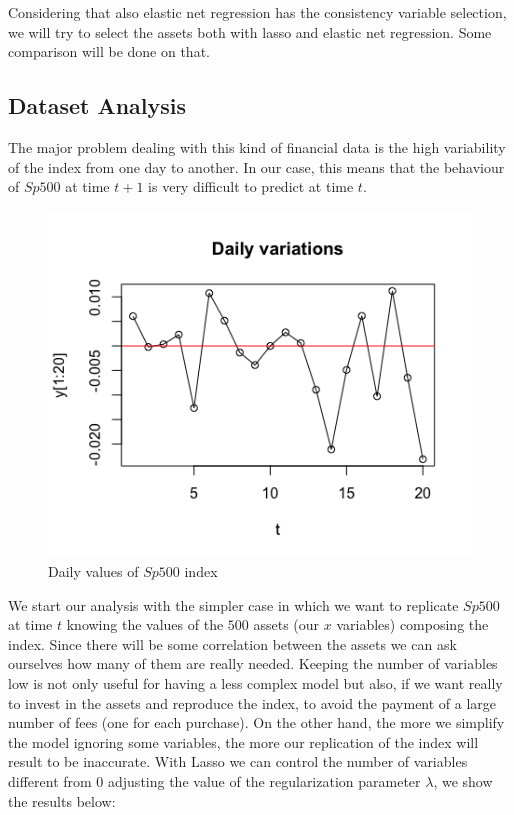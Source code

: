 \documentclass{article}%
\begin{document}
Considering that also elastic net regression has the consistency variable selection, we will try to select the assets both with lasso and elastic net regression. Some comparison will be done on that.

\subsection{Dataset Analysis}
The major problem dealing with this kind of financial data is the high variability of the index from one day to another. In our case, this means that the behaviour of  $Sp500$ at time $t+1$ is very difficult to predict at time $t$.
\begin{figure}[h!]
  \centering
  \includegraphics[scale=0.6]{daily_var.png}
  \caption{Daily values of $Sp500$ index}
  \label{daily_var}
\end{figure}

We start our analysis with the simpler case in which we want to replicate $Sp500$ at time $t$ knowing the values of the $500$ assets (our $x$ variables) composing the index. Since there will be some correlation between the assets we can ask ourselves how many of them are really needed. Keeping the number of variables low is not only useful for having a less complex model but also, if we want really to invest in the assets and reproduce the index, to avoid the payment of a large number of fees (one for each purchase). On the other hand, the more we simplify the model ignoring some variables, the more our replication of the index will result to be inaccurate. With Lasso we can control the number of variables different from $0$ adjusting the value of the regularization parameter $\lambda$, we show the results below: 
\end{document}
